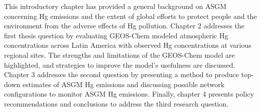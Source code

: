 \begin{flushleft}
  This introductory chapter has provided a general background on ASGM concerning Hg emissions and the extent of global efforts to protect people and the environment from the adverse effects of Hg pollution. Chapter 2 addresses the first thesis question by evaluating GEOS-Chem modeled atmospheric Hg concentrations across Latin America with observed Hg concentrations at various regional sites. The strengths and limitations of the GEOS-Chem model are highlighted, and strategies to improve the model's usefulness are discussed. Chapter 3 addresses the second question by presenting a method to produce top-down estimates of ASGM Hg emissions and discussing possible network configurations to monitor ASGM Hg emissions. Finally, chapter 4 presents policy recommendations and conclusions to address the third research question.  
\end{flushleft}



